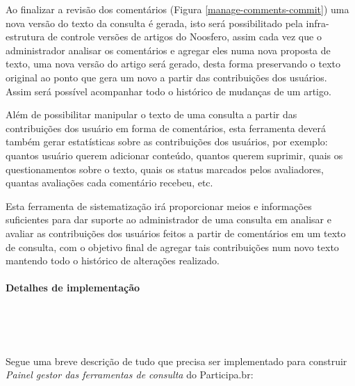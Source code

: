 \documentclass[12pt]{article}
\begin{document}
Ao finalizar a revisão dos comentários (Figura \ref{manage-comments-commit}) uma
nova versão do texto da consulta é gerada, isto será possibilitado pela
infra-estrutura de controle versões de artigos do Noosfero, assim cada vez que
o administrador analisar os comentários e agregar eles numa nova proposta de
texto, uma nova versão do artigo será gerado, desta forma preservando o
texto original ao ponto que gera um novo a partir das contribuições dos
usuários. Assim será possível acompanhar todo o histórico de mudanças de um
artigo.

Além de possibilitar manipular o texto de uma consulta a partir das
contribuições dos usuário em forma de comentários, esta ferramenta deverá
também gerar estatísticas sobre as contribuições dos usuários, por
exemplo: quantos usuário querem adicionar conteúdo, quantos querem suprimir,
quais os questionamentos sobre o texto, quais os status marcados pelos
avaliadores, quantas avaliações cada comentário recebeu, etc.

Esta ferramenta de sistematização irá proporcionar meios e informações
suficientes para dar suporte ao administrador de uma consulta em analisar e
avaliar as contribuições dos usuários feitos a partir de comentários em um
texto de consulta, com o objetivo final de agregar tais contribuições num novo
texto mantendo todo o histórico de alterações realizado.

\paragraph{Detalhes de implementação} \

\

Segue uma breve descrição de tudo que precisa ser implementado para construir
{\it Painel gestor das ferramentas de consulta} do Participa.br:
\end{document}
